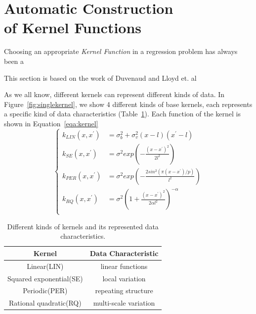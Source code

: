 \section{Automatic Construction\\ of Kernel Functions} \label{sec:autokernel}
Choosing an appropriate \emph{Kernel Function} in a regression problem has always been a 

This section is based on the work of Duvenaud and Lloyd et. al
\cite{duvenaud2013structure,lloyd2014automatic,duvenaud2014automatic}

As we all know, different kernels can represent different kinds of data. In Figure~\ref{fig:singlekernel}, we show 4 different kinds of base kernels, each represents a specific kind of data characteristics (Table~\ref{tab:kernel}). Each function of the kernel is shown in Equation~\ref{eqa:kernel}
\begin{equation}
\left \{
\begin{aligned} \label{eqa:kernel}
k_{LIN}(x,x^{'}) &= \sigma_{b}^{2} + \sigma_{v}^{2} (x-l)(x^{'}-l) 	\\
k_{SE}(x,x^{'}) &= \sigma^2 exp(-\frac{(x-x^{'})^2}{2l^2})	\\
k_{PER}(x,x^{'}) &= \sigma^2 exp(-\frac{2sin^2 (\pi(x-x^{'})/p)}{l^2})	\\
k_{RQ}(x,x^{'}) &= \sigma^2 (1+\frac{(x-x^{'})^2}{2\alpha l^2})^{-\alpha}	\\
\end{aligned}
\right.
\end{equation}


\begin{table}[htp]
\centering
{\small
\begin{tabular}{c|c}
    \hline
    \textbf{Kernel} & \textbf{Data Characteristic} \\ 
    \hline
	   Linear(LIN) & linear functions\\
	   Squared exponential(SE) & local variation\\
	   Periodic(PER) & repeating structure\\
	   Rational quadratic(RQ) & multi-scale variation\\
	   \hline
\end{tabular}
}
\vspace{-0.1in}
\caption{Different kinds of kernels and its represented data characteristics.}
\label{tab:kernel}
\end{table}



